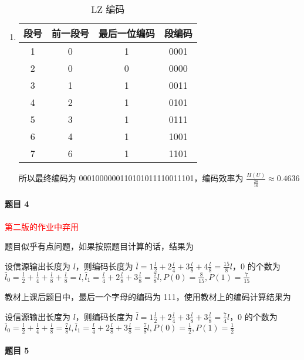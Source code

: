 \documentclass{ctexart}
\begin{document}
\begin{enumerate}
    \item\begin{table}[H]
        \centering
        \caption{LZ 编码}
        \begin{tabular}{cccc}
            \hline
            段号 & 前一段号 & 最后一位编码 & 段编码 \\
            \hline
            1 & 0 & 1 & 0001 \\
            2 & 0 & 0 & 0000 \\
            3 & 1 & 1 & 0011 \\
            4 & 2 & 1 & 0101 \\
            5 & 3 & 1 & 0111 \\
            6 & 4 & 1 & 1001 \\
            7 & 6 & 1 & 1101 \\
            \hline
        \end{tabular}
    \end{table}
    所以最终编码为 0001000000110101011110011101，编码效率为 $\frac{H(U)}{\frac{28}{16}} \approx 0.4636$
\end{enumerate}

\paragraph{题目 4}\textcolor{red}{第二版的作业中弃用}

题目似乎有点问题，如果按照题目计算的话，结果为

设信源输出长度为 $l$，则编码长度为 $\bar{l} = 1\frac{l}{2} + 2\frac{l}{4} + 3\frac{l}{8} + 4\frac{l}{8} = \frac{15}{8}l$，0 的个数为 $\bar{l}_0 = \frac{l}{2} + \frac{l}{4} + \frac{l}{8} + \frac{l}{8} = l, \bar{l}_1 = \frac{l}{4} + 2\frac{l}{8} + 3\frac{l}{8} = \frac{7}{8}l, P(0) = \frac{8}{15}, P(1) = \frac{7}{15}$

教材上课后题目中，最后一个字母的编码为 111，使用教材上的编码计算结果为

设信源输出长度为 $l$，则编码长度为 $\bar{l} = 1\frac{l}{2} + 2\frac{l}{4} + 3\frac{l}{8} + 3\frac{l}{8} = \frac{7}{4}l$，0 的个数为 $\bar{l}_0 = \frac{l}{2} + \frac{l}{4} + \frac{l}{8} = \frac{7}{8}l, \bar{l}_1 = \frac{l}{4} + 2\frac{l}{8} + 3\frac{l}{8} = \frac{7}{8}l, P(0) = \frac{1}{2}, P(1) = \frac{1}{2}$

\paragraph{题目 5}
\end{document}

